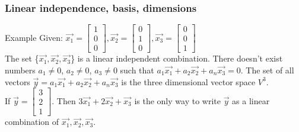 \begin{frame}
	\frametitle{Linear independence, basis, dimensions}
	\begin{block}{Example}
		Given: $\overrightarrow{x_1}=\begin{bmatrix} 1\\0\\0\end{bmatrix}, \overrightarrow{x_2}=\begin{bmatrix} 0\\1\\0\end{bmatrix}, \overrightarrow{x_3}=\begin{bmatrix} 0\\0\\1\end{bmatrix}$\\
		The set \{$\overrightarrow{x_1},\overrightarrow{x_2},\overrightarrow{x_3}$\} is a linear independent combination. There doesn't exist numbers $a_1\neq0$, $a_2\neq0$, $a_3\neq0$ such that $a_1\overrightarrow{x_1}+a_2\overrightarrow{x_2}+a_n\overrightarrow{x_3}=0$. The set of all vectors $\overrightarrow{y}= a_1\overrightarrow{x_1}+ a_2\overrightarrow{x_2}+ a_n\overrightarrow{x_3}$ is the three dimensional vector space $V^3$.\\
		If $\overrightarrow{y}=\begin{bmatrix} 3\\2\\1\end{bmatrix}$. Then $3\overrightarrow{x_1}+2\overrightarrow{x_2}+\overrightarrow{x_3}$ is the only way to write $\overrightarrow{y}$ as a linear combination of $\overrightarrow{x_1},\overrightarrow{x_2},\overrightarrow{x_3}$.
	\end{block}
\end{frame}

